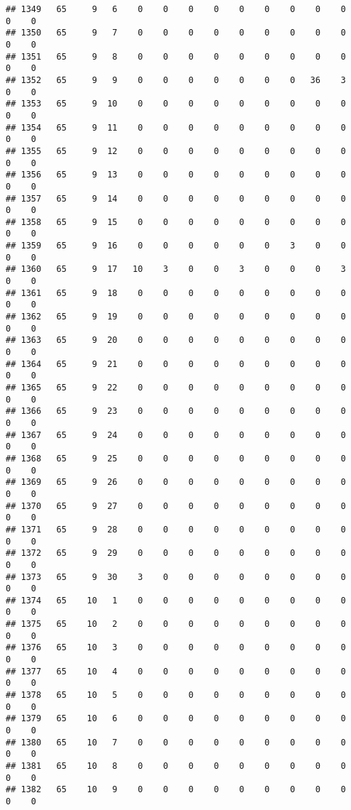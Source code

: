 \documentclass[]{article}
\begin{document}
\begin{verbatim}
## 1349   65     9   6    0    0    0    0    0    0    0    0    0    0    0
## 1350   65     9   7    0    0    0    0    0    0    0    0    0    0    0
## 1351   65     9   8    0    0    0    0    0    0    0    0    0    0    0
## 1352   65     9   9    0    0    0    0    0    0    0   36    3    0    0
## 1353   65     9  10    0    0    0    0    0    0    0    0    0    0    0
## 1354   65     9  11    0    0    0    0    0    0    0    0    0    0    0
## 1355   65     9  12    0    0    0    0    0    0    0    0    0    0    0
## 1356   65     9  13    0    0    0    0    0    0    0    0    0    0    0
## 1357   65     9  14    0    0    0    0    0    0    0    0    0    0    0
## 1358   65     9  15    0    0    0    0    0    0    0    0    0    0    0
## 1359   65     9  16    0    0    0    0    0    0    3    0    0    0    0
## 1360   65     9  17   10    3    0    0    3    0    0    0    3    0    0
## 1361   65     9  18    0    0    0    0    0    0    0    0    0    0    0
## 1362   65     9  19    0    0    0    0    0    0    0    0    0    0    0
## 1363   65     9  20    0    0    0    0    0    0    0    0    0    0    0
## 1364   65     9  21    0    0    0    0    0    0    0    0    0    0    0
## 1365   65     9  22    0    0    0    0    0    0    0    0    0    0    0
## 1366   65     9  23    0    0    0    0    0    0    0    0    0    0    0
## 1367   65     9  24    0    0    0    0    0    0    0    0    0    0    0
## 1368   65     9  25    0    0    0    0    0    0    0    0    0    0    0
## 1369   65     9  26    0    0    0    0    0    0    0    0    0    0    0
## 1370   65     9  27    0    0    0    0    0    0    0    0    0    0    0
## 1371   65     9  28    0    0    0    0    0    0    0    0    0    0    0
## 1372   65     9  29    0    0    0    0    0    0    0    0    0    0    0
## 1373   65     9  30    3    0    0    0    0    0    0    0    0    0    0
## 1374   65    10   1    0    0    0    0    0    0    0    0    0    0    0
## 1375   65    10   2    0    0    0    0    0    0    0    0    0    0    0
## 1376   65    10   3    0    0    0    0    0    0    0    0    0    0    0
## 1377   65    10   4    0    0    0    0    0    0    0    0    0    0    0
## 1378   65    10   5    0    0    0    0    0    0    0    0    0    0    0
## 1379   65    10   6    0    0    0    0    0    0    0    0    0    0    0
## 1380   65    10   7    0    0    0    0    0    0    0    0    0    0    0
## 1381   65    10   8    0    0    0    0    0    0    0    0    0    0    0
## 1382   65    10   9    0    0    0    0    0    0    0    0    0    0    0

\end{verbatim}
\end{document}
